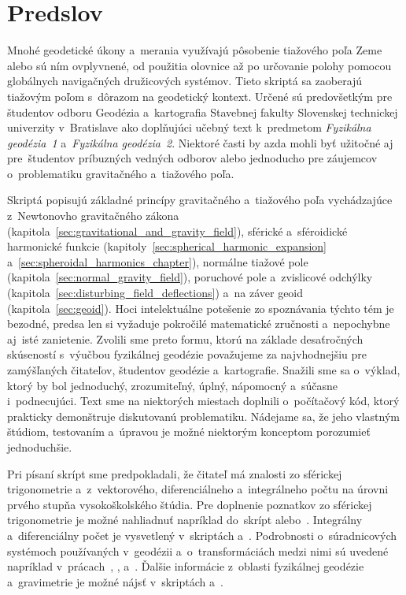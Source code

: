 \documentclass[a4paper, 12pt]{book}
\begin{document}

\chapter*{Predslov}

Mnohé geodetické úkony a~merania využívajú pôsobenie tiažového poľa Zeme alebo 
sú ním ovplyvnené, od použitia olovnice až po určovanie polohy pomocou 
globálnych navigačných družicových systémov.  Tieto skriptá sa zaoberajú 
tiažovým poľom s~dôrazom na geodetický kontext.  Určené sú predovšetkým pre 
študentov odboru Geodézia a~kartografia Stavebnej fakulty Slovenskej technickej 
univerzity v~Bratislave ako doplňujúci učebný text k~predmetom \emph{Fyzikálna 
geodézia~1} a~\emph{Fyzikálna geodézia~2}.  Niektoré časti by azda mohli byť 
užitočné aj pre~študentov príbuzných vedných odborov alebo jednoducho pre 
záujemcov o~problematiku gravitačného a~tiažového poľa.

Skriptá popisujú základné princípy gravitačného a~tiažového poľa vychádzajúce 
z~Newtonovho gravitačného zákona 
(kapitola~\ref{sec:gravitational_and_gravity_field}), sférické a~sféroidické 
harmonické funkcie (kapitoly~\ref{sec:spherical_harmonic_expansion} 
a~\ref{sec:spheroidal_harmonics_chapter}), normálne tiažové pole 
(kapitola~\ref{sec:normal_gravity_field}), poruchové pole a~zvislicové odchýlky 
(kapitola~\ref{sec:disturbing_field_deflections}) a~na záver geoid 
(kapitola~\ref{sec:geoid}).  Hoci intelektuálne potešenie zo spoznávania týchto 
tém je bezodné, predsa len si vyžaduje pokročilé matematické zručnosti 
a~nepochybne aj~isté zanietenie.  Zvolili sme preto formu, ktorú na základe 
desaťročných skúseností s~výučbou fyzikálnej geodézie považujeme za 
najvhodnejšiu pre zamýšľaných čitateľov, študentov geodézie a~kartografie.  
Snažili sme sa o~výklad, ktorý by bol jednoduchý, zrozumiteľný, úplný, 
nápomocný a~súčasne i~podnecujúci.   Text sme na niektorých miestach doplnili 
o~počítačový kód, ktorý prakticky demonštruje diskutovanú problematiku.  
Nádejame sa, že jeho vlastným štúdiom, testovaním a~úpravou je možné niektorým 
konceptom porozumieť jednoduchšie.

Pri písaní skrípt sme predpokladali, že čitateľ má znalosti zo sférickej 
trigonometrie a~z~vektorového, diferenciálneho a~integrálneho počtu na úrovni 
prvého stupňa vysokoškolského štúdia.  Pre doplnenie poznatkov zo sférickej 
trigonometrie je možné nahliadnuť napríklad do~skrípt \textcite{Husar2017} 
alebo~\textcite{Minarechova2019}.  Integrálny a~diferenciálny počet je 
vysvetlený v~skriptách \textcite{Minarechova2019} a~\textcite{Macak2021}.  
Podrobnosti o~súradnicových systémoch používaných v~geodézii 
a~o~transformáciách medzi nimi sú uvedené napríklad 
v~prácach~\textcite{Melicher1993}, \textcite{Kostelecky2008}, 
\textcite{Melicher2009} a~\textcite{Husar2017}.  Ďalšie informácie z~oblasti 
fyzikálnej geodézie a~gravimetrie je možné nájsť v~skriptách 
\textcite{Janak2006} a~\textcite{Janak2010}.
\end{document}
